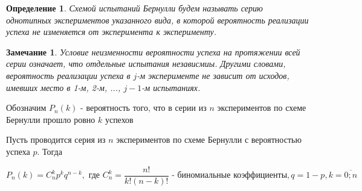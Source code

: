 \documentclass[a4paper, 14pt]{report}
\newtheorem{defenition}{Определение}[section]
\newtheorem{note}{Замечание}[section]
\begin{document}
\begin{defenition}
    Схемой испытаний Бернулли будем называть серию однотипных экспериментов указанного вида, в которой вероятность реализации успеха не изменяется от эксперимента к эксперименту.
\end{defenition}

\begin{note}
    Условие неизменности вероятности успеха на протяжении всей серии означает, что отдельные испытания независмиы. Другими словами, вероятность реализации успеха в $j$-м эксперименте не зависит от исходов, имевших место в 1-м, 2-м, ..., $j-1$-м испытаниях.
\end{note}

Обозначим $P_n(k)$ - вероятность того, что в серии из $n$ экспериментов по схеме Бернулли прошло ровно $k$ успехов

\begin{theorem}
    Пусть проводится серия из $n$ экспериментов по схеме Бернулли с вероятностью успеха $p$. Тогда

    $$
    P_n(k) = C_n^k p^k q^{n-k}, \text{ где } C_n^k = \frac{n!}{k!(n-k)!} \text{ - биномиальные коэффициенты}, q = 1-p, k = \overline{0;n}
    $$
\end{theorem}
\end{document}
